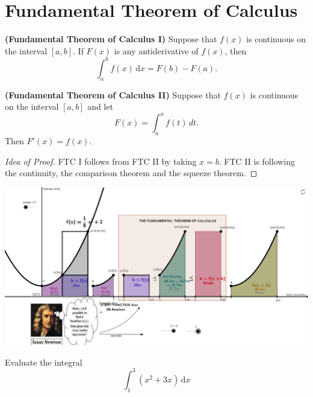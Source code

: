 
\hypertarget{fundamental-theorem-of-calculus}{%
\section{Fundamental Theorem of
Calculus}\label{fundamental-theorem-of-calculus}}

\begin{theorem}

\textbf{(Fundamental Theorem of Calculus I)} Suppose that \(f(x)\) is
continuous on the interval \([a,b]\). If \(F(x)\) is any antiderivative
of \(f(x)\), then \[\int_a^b f(x)\,\mathrm{d}x = F(b)-F(a).\]

\end{theorem}

\begin{theorem}

\textbf{(Fundamental Theorem of Calculus II)} Suppose that \(f(x)\) is
continuous on the interval \([a,b]\) and let \[F(x)=\int_a^x f(t)\,dt.\]
Then \(F'(x)=f(x)\).

\end{theorem}

\begin{proof}[Idea of Proof] FTC I follows from FTC II by taking \(x=b\). FTC
II is following the continuity, the comparison theorem and the squeeze
theorem.

\end{proof}

\begin{fullwidth}
  \centering
  \href{https://www.geogebra.org/m/wdUED3wy}{\includegraphics[width=0.8\linewidth]{img/image-20200427155419418.png}}
\end{fullwidth}


\begin{example}

Evaluate the integral \[ \int_1^3 (x^2+3x)\,\mathrm{d}x\]

\end{example}
\vspace*{6\baselineskip}


